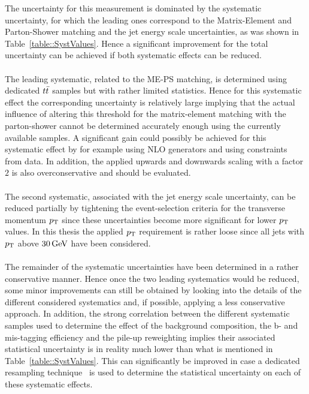 The uncertainty for this measurement is dominated by the systematic uncertainty, for which the leading ones correspond to the Matrix-Element and Parton-Shower matching and the jet energy scale uncertainties, as was shown in Table~\ref{table::SystValues}.
Hence a significant improvement for the total uncertainty can be achieved if both systematic effects can be reduced.
\\
\\
The leading systematic, related to the ME-PS matching, is determined using dedicated $t\bar{t}$ samples but with rather limited statistics. Hence for this systematic effect the corresponding uncertainty is relatively large implying that the actual influence of altering this threshold for the matrix-element matching with the parton-shower cannot be determined accurately enough using the currently available samples.
A significant gain could possibly be achieved for this systematic effect by for example using NLO generators and using constraints from data.
In addition, the applied upwards and downwards scaling with a factor $2$ is also overconservative and should be evaluated.
\\
\\
The second systematic, associated with the jet energy scale uncertainty, can be reduced partially by tightening the event-selection criteria for the transverse momentum $p_{\rm T}$ since these uncertainties become more significant for lower $p_{\rm T}$ values.
In this thesis the applied $p_{\rm T}$ requirement is rather loose since all jets with $p_{\rm T}$ above $30 \, \mathrm{GeV}$ have been considered.
\\
\\
The remainder of the systematic uncertainties have been determined in a rather conservative manner.
Hence once the two leading systematics would be reduced, some minor improvements can still be obtained by looking into the details of the different considered systematics and, if possible, applying a less conservative approach.
In addition, the strong correlation between the different systematic samples used to determine the effect of the background composition, the b- and mis-tagging efficiency and the pile-up reweighting implies their associated statistical uncertainty is in reality much lower than what is mentioned in Table~\ref{table::SystValues}. This can significantly be improved in case a dedicated resampling technique~\cite{Jackknife} is used to determine the statistical uncertainty on each of these systematic effects.

